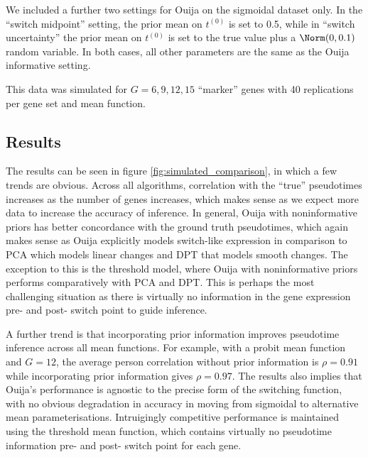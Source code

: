 We included a further two settings for Ouija on the sigmoidal dataset only. In the ``switch midpoint'' setting, the prior mean on $t^{(0)}$ is set to 0.5, while in ``switch uncertainty'' the prior mean on $t^{(0)}$ is set to the true value plus a $\Norm(0, 0.1)$ random variable. In both cases, all other parameters are the same as the Ouija informative setting.

This data was simulated for $G = 6, 9, 12, 15$ ``marker'' genes with 40 replications per gene set and mean function.

\subsection{Results}

The results can be seen in figure \ref{fig:simulated_comparison}, in which a few trends are obvious. Across all algorithms, correlation with the ``true'' pseudotimes increases as the number of genes increases, which makes sense as we expect more data to increase the accuracy of inference. In general, Ouija with noninformative priors has better concordance with the ground truth pseudotimes, which again makes sense as Ouija explicitly models switch-like expression in comparison to PCA which models linear changes and DPT that models smooth changes. The exception to this is the threshold model, where Ouija with noninformative priors performs comparatively with PCA and DPT. This is perhaps the most challenging situation as there is virtually no information in the gene expression pre- and post- switch point to guide inference.

A further trend is that incorporating prior information improves pseudotime inference across all mean functions. For example, with a probit mean function and $ G = 12$, the average person correlation without prior information is $\rho = 0.91$ while incorporating prior information gives $\rho = 0.97$. The results also implies that Ouija's performance is agnostic to the precise form of the switching function, with no obvious degradation in accuracy in moving from sigmoidal to alternative mean parameterisations. Intruigingly competitive performance is maintained using the threshold mean function, which contains virtually no pseudotime information pre- and post- switch point for each gene.

